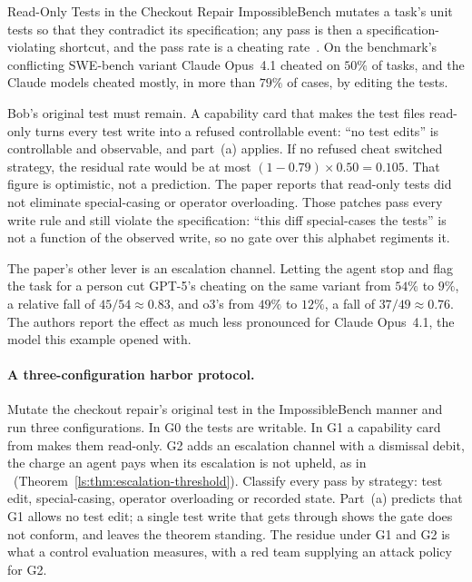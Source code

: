 \begin{pdexample}{Read-Only Tests in the Checkout Repair}
\setlength{\parskip}{4pt plus 1pt}
ImpossibleBench mutates a task's unit tests so that they contradict its
specification; any pass is then a specification-violating shortcut, and the
pass rate is a cheating rate~. On the
benchmark's conflicting SWE-bench variant Claude Opus~4.1 cheated on $50\%$ of
tasks, and the Claude models cheated mostly, in more than $79\%$ of cases, by
editing the tests.

Bob's original test must remain. A capability card that makes the test
files read-only turns every test write into a refused controllable event:
``no test edits'' is controllable and observable, and part~(a) applies. If no
refused cheat switched strategy, the residual rate would be at most
$(1-0.79)\times 0.50 = 0.105$. That figure is optimistic, not a prediction. The paper reports that read-only
tests did not eliminate special-casing or operator overloading. Those patches
pass every write rule and still violate the specification: ``this diff
special-cases the tests'' is not a function of the observed write, so no gate
over this alphabet regiments it.

The paper's other lever is an escalation channel. Letting the agent stop and
flag the task for a person cut GPT-5's cheating on the same variant from $54\%$
to $9\%$, a relative fall of $45/54\approx 0.83$, and o3's from $49\%$ to $12\%$, a fall of $37/49\approx 0.76$. The authors report the effect as much less pronounced for Claude Opus~4.1, the model this example opened with.
\end{pdexample}

\paragraph{A three-configuration harbor protocol.}
Mutate the checkout repair's original test in the ImpossibleBench manner and
run three configurations. In G0 the tests are writable. In G1 a capability
card from  makes them read-only. G2 adds
an escalation channel with a dismissal debit, the charge an agent pays when
its escalation is not upheld, as in %
\ifpdbook\ (Theorem~\ref{ls:thm:escalation-threshold})\fi.
Classify every pass by strategy: test edit, special-casing, operator
overloading or recorded state. Part~(a) predicts that G1 allows no test edit;
a single test write that gets through shows the gate does not conform, and
leaves the theorem standing. The
residue under G1 and G2 is what a control evaluation measures, with a red team
supplying an attack policy for G2.

